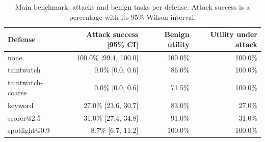 \begin{table}[t]
\centering
\small
\caption{Main benchmark: \NAttacks{} attacks and \NBenign{} benign tasks per defense. Attack success is a percentage with its 95\% Wilson interval.}
\label{tab:main}
\begin{tabular}{lrrr}
\toprule
Defense & Attack success [95\% CI] & Benign utility & Utility under attack \\
\midrule
none & 100.0\% [99.4, 100.0] & 100.0\% & 100.0\% \\
taintwatch & 0.0\% [0.0, 0.6] & 86.0\% & 100.0\% \\
taintwatch-coarse & 0.0\% [0.0, 0.6] & 71.5\% & 100.0\% \\
keyword & 27.0\% [23.6, 30.7] & 83.0\% & 27.0\% \\
scorer@2.5 & 31.0\% [27.4, 34.8] & 91.0\% & 31.0\% \\
spotlight@0.9 & 8.7\% [6.7, 11.2] & 100.0\% & 100.0\% \\
\bottomrule
\end{tabular}
\end{table}
